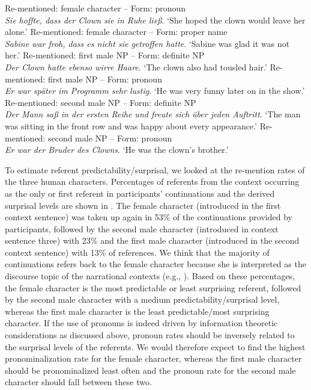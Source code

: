 \documentclass[output=paper,colorlinks,citecolor=brown]{langscibook}
\begin{document}
\ea\label{ex:cont} \ea Re-mentioned: female character  -- Form: pronoun\\
        \textit{Sie hoffte, dass der Clown sie in Ruhe ließ}.
    \glt \enquote*{She hoped the clown would leave her alone.}
    \ex Re-mentioned: female character  -- Form: proper name\\
        \textit{Sabine war froh, dass es nicht sie getroffen hatte}.
    \glt \enquote*{Sabine was glad it was not her.}
    \ex Re-mentioned: first male NP  -- Form: definite NP\\
        \textit{Der Clown hatte ebenso wirre Haare}.
    \glt \enquote*{The clown also had tousled hair.}    
    \ex Re-mentioned: first male NP  -- Form: pronoun\\
        \textit{Er war später im Programm sehr lustig}.
    \glt \enquote*{He was very funny later on in the show.}
    \ex Re-mentioned: second male NP  -- Form: definite NP\\
        \textit{Der Mann saß in der ersten Reihe und freute sich über jeden Auftritt}.
    \glt \enquote*{The man was sitting in the front row and was happy about every appearance.}  
    \ex Re-mentioned: second male NP  -- Form: pronoun\\
        \textit{Er war der Bruder des Clowns}.
    \glt \enquote*{He was the clown's brother.} 
\z\z



To estimate referent predictability/surprisal, we looked at the re-mention rates of the three human characters. Percentages of referents from the context occurring as the only or first referent in participants’ continuations and the derived surprisal levels are shown in .
The female character (introduced in the first context sentence) was taken up again in 53\% of the continuations provided by participants, followed by the second male character (introduced in context sentence three) with 23\% and the first male character (introduced in the second context sentence) with 13\% of references. We think that the majority of continuations refers back to the female character because she is interpreted as the discourse topic of the narrational contexts (e.g., \citealt{Asher-04}). Based on these percentages, the female character is the most predictable or least surprising referent, followed by the second male character with a medium predictability/surprisal level, whereas the first male character is the least predictable/most surprising character.
If the use of pronouns is indeed driven by information theoretic considerations as discussed above, pronoun rates should be inversely related to the surprisal levels of the referents. We would therefore expect to find the highest pronominalization rate for the female character, whereas the first male character should be pronominalized least often and the pronoun rate for the second male character should fall between these two.
\end{document}
